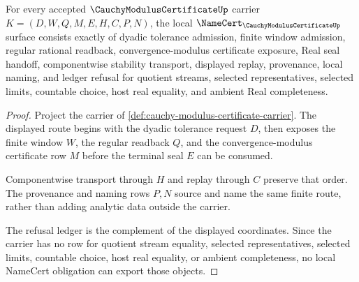 \begin{theorem}
\label{thm:cauchy-modulus-certificate-namecert-obligations}
For every accepted $\CauchyModulusCertificateUp$ carrier $K=(D,W,Q,M,E,H,C,P,N)$, the local $\NameCert_{\CauchyModulusCertificateUp}$ surface consists exactly of dyadic tolerance admission, finite window admission, regular rational readback, convergence-modulus certificate exposure, Real seal handoff, componentwise stability transport, displayed replay, provenance, local naming, and ledger refusal for quotient streams, selected representatives, selected limits, countable choice, host real equality, and ambient Real completeness.
\end{theorem}
\begin{proof}
Project the carrier of \autoref{def:cauchy-modulus-certificate-carrier}. The displayed route begins with the dyadic tolerance request $D$, then exposes the finite window $W$, the regular readback $Q$, and the convergence-modulus certificate row $M$ before the terminal seal $E$ can be consumed.

Componentwise transport through $H$ and replay through $C$ preserve that order. The provenance and naming rows $P,N$ source and name the same finite route, rather than adding analytic data outside the carrier.

The refusal ledger is the complement of the displayed coordinates. Since the carrier has no row for quotient stream equality, selected representatives, selected limits, countable choice, host real equality, or ambient completeness, no local NameCert obligation can export those objects.
\end{proof}

